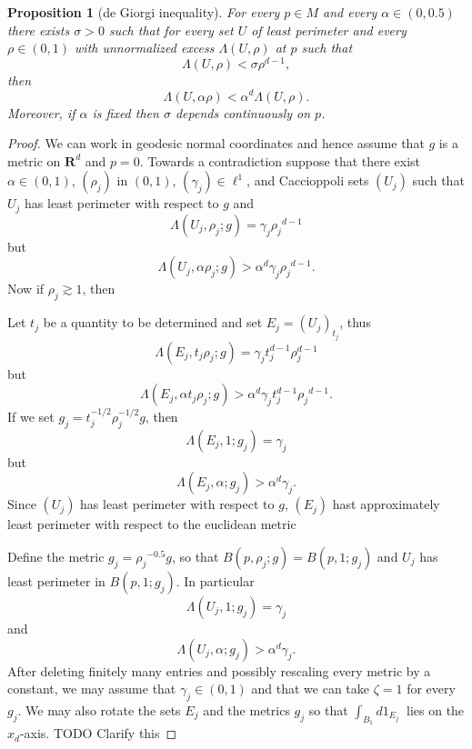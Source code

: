 \documentclass[reqno,12pt,letterpaper]{amsart}
\newcommand{\RR}{\mathbf{R}}
\newtheorem{proposition}[theorem]{Proposition}
\theoremstyle{definition}
\numberwithin{equation}{section}
\begin{document}
\begin{proposition}[de Giorgi inequality]\label{induction 2}
For every $p \in M$ and every $\alpha \in (0, 0.5)$ there exists $\sigma > 0$ such that for every set $U$ of least perimeter and every $\rho \in (0, 1)$ with unnormalized excess $\Lambda(U, \rho)$ at $p$ such that
$$\Lambda(U, \rho) < \sigma \rho^{d - 1},$$
then
$$\Lambda(U, \alpha\rho) < \alpha^d \Lambda(U, \rho).$$
Moreover, if $\alpha$ is fixed then $\sigma$ depends continuously on $p$.
\end{proposition}
\begin{proof}
We can work in geodesic normal coordinates and hence assume that $g$ is a metric on $\RR^d$ and $p = 0$.
Towards a contradiction suppose that there exist $\alpha \in (0, 1)$, $(\rho_j)$ in $(0, 1)$, $(\gamma_j) \in \ell^1$, and Caccioppoli sets $(U_j)$ such that $U_j$ has least perimeter with respect to $g$ and
$$\Lambda(U_j, \rho_j; g) = \gamma_j {\rho_j}^{d - 1}$$
but
$$\Lambda(U_j, \alpha \rho_j; g) > \alpha^d \gamma_j {\rho_j}^{d - 1}.$$
Now if $\rho_j \gtrsim 1$, then

Let $t_j$ be a quantity to be determined and set $E_j = (U_j)_{t_j}$, thus
$$\Lambda(E_j, t_j \rho_j; g) = \gamma_j t_j^{d - 1} \rho_j^{d - 1}$$
but
$$\Lambda(E_j, \alpha t_j \rho_j; g) > \alpha^d \gamma_j t_j^{d - 1} {\rho_j}^{d - 1}.$$
If we set $g_j = t_j^{-1/2} \rho_j^{-1/2} g$, then
$$\Lambda(E_j, 1; g_j) = \gamma_j$$
but
$$\Lambda(E_j, \alpha; g_j) > \alpha^d \gamma_j.$$
Since $(U_j)$ has least perimeter with respect to $g$, $(E_j)$ hast approximately least perimeter with respect to the euclidean metric






Define the metric $g_j = {\rho_j}^{-0.5} g$, so that $B(p, \rho_j; g) = B(p, 1; g_j)$ and $U_j$ has least perimeter in $B(p, 1; g_j)$.
In particular
$$\Lambda(U_j, 1; g_j) = \gamma_j$$
and
$$\Lambda(U_j, \alpha; g_j) > \alpha^d \gamma_j.$$
After deleting finitely many entries and possibly rescaling every metric by a constant, we may assume that $\gamma_j \in (0, 1)$ and that we can take $\zeta = 1$ for every $g_j$.
We may also rotate the sets $E_j$ and the metrics $g_j$ so that $\int_{B_1} d1_{E_j} ~$ lies on the $x_d$-axis.
TODO Clarify this


\end{proof}
\end{document}
